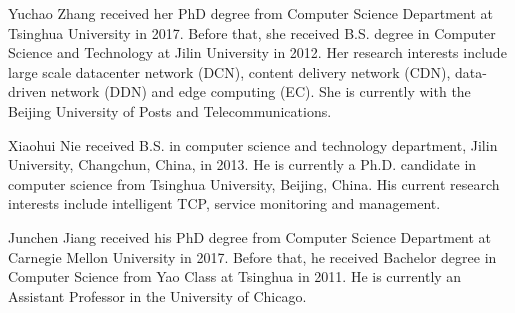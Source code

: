 \documentclass[10pt,journal,compsoc]{IEEEtran}
\begin{document}
\begin{IEEEbiography}
{Yuchao Zhang} received her PhD degree from Computer Science Department at Tsinghua University in 2017. Before that, she received B.S. degree in Computer Science and Technology at Jilin University in 2012. Her research interests include large scale datacenter network (DCN), content delivery network (CDN), data-driven network (DDN) and edge computing (EC). She is currently with the Beijing University of Posts and Telecommunications.
\end{IEEEbiography}

\begin{IEEEbiography}
{Xiaohui Nie} received B.S. in computer science and technology department, Jilin University, Changchun, China, in 2013. He is currently a Ph.D. candidate in computer science from Tsinghua University, Beijing, China. His current research interests include intelligent TCP, service monitoring and management.
\end{IEEEbiography}

\begin{IEEEbiography}
{Junchen Jiang} received his PhD degree from Computer Science Department at Carnegie Mellon University in 2017. Before that, he received Bachelor degree in Computer Science from Yao Class at Tsinghua in 2011. He is currently an Assistant Professor in the University of Chicago.
\end{IEEEbiography}
\end{document}
